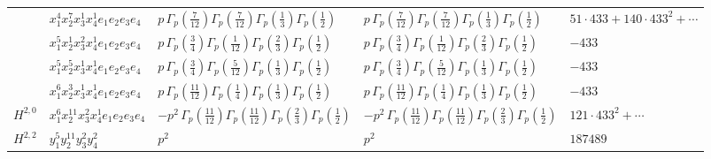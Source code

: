\documentclass[11pt]{article}
\begin{document}
\begin{table}[ht]
{\begin{tabular}{@{}lllll@{}}
 & $x_{1}^{4} x_{2}^{7} x_{3}^{1} x_{4}^{1}  e_{1} e_{2} e_{3} e_{4}$ & $p \, \Gamma_p \left( \frac{7}{12} \right) \Gamma_p \left( \frac{7}{12} \right) \Gamma_p \left( \frac{1}{3} \right) \Gamma_p \left( \frac{1}{2} \right)$ & $p \, \Gamma_p \left( \frac{7}{12} \right) \Gamma_p \left( \frac{7}{12} \right) \Gamma_p \left( \frac{1}{3} \right) \Gamma_p \left( \frac{1}{2} \right)$ & $51{\cdot}433{+}140{\cdot}433^{2}{+}\cdots$ \\
 & $x_{1}^{5} x_{2}^{1} x_{3}^{2} x_{4}^{1}  e_{1} e_{2} e_{3} e_{4}$ & $p \, \Gamma_p \left( \frac{3}{4} \right) \Gamma_p \left( \frac{1}{12} \right) \Gamma_p \left( \frac{2}{3} \right) \Gamma_p \left( \frac{1}{2} \right)$ & $p \, \Gamma_p \left( \frac{3}{4} \right) \Gamma_p \left( \frac{1}{12} \right) \Gamma_p \left( \frac{2}{3} \right) \Gamma_p \left( \frac{1}{2} \right)$ & $-433$ \\
 & $x_{1}^{5} x_{2}^{5} x_{3}^{1} x_{4}^{1}  e_{1} e_{2} e_{3} e_{4}$ & $p \, \Gamma_p \left( \frac{3}{4} \right) \Gamma_p \left( \frac{5}{12} \right) \Gamma_p \left( \frac{1}{3} \right) \Gamma_p \left( \frac{1}{2} \right)$ & $p \, \Gamma_p \left( \frac{3}{4} \right) \Gamma_p \left( \frac{5}{12} \right) \Gamma_p \left( \frac{1}{3} \right) \Gamma_p \left( \frac{1}{2} \right)$ & $-433$ \\
 & $x_{1}^{6} x_{2}^{3} x_{3}^{1} x_{4}^{1}  e_{1} e_{2} e_{3} e_{4}$ & $p \, \Gamma_p \left( \frac{11}{12} \right) \Gamma_p \left( \frac{1}{4} \right) \Gamma_p \left( \frac{1}{3} \right) \Gamma_p \left( \frac{1}{2} \right)$ & $p \, \Gamma_p \left( \frac{11}{12} \right) \Gamma_p \left( \frac{1}{4} \right) \Gamma_p \left( \frac{1}{3} \right) \Gamma_p \left( \frac{1}{2} \right)$ & $-433$ \\
\midrule
$H^{2,0}$ & $x_{1}^{6} x_{2}^{11} x_{3}^{2} x_{4}^{1}  e_{1} e_{2} e_{3} e_{4}$ & $- p^{2} \, \Gamma_p \left( \frac{11}{12} \right) \Gamma_p \left( \frac{11}{12} \right) \Gamma_p \left( \frac{2}{3} \right) \Gamma_p \left( \frac{1}{2} \right)$ & $- p^{2} \, \Gamma_p \left( \frac{11}{12} \right) \Gamma_p \left( \frac{11}{12} \right) \Gamma_p \left( \frac{2}{3} \right) \Gamma_p \left( \frac{1}{2} \right)$ & $121{\cdot}433^{2}{+}\cdots$ \\
\midrule
$H^{2,2}$ & $y_{1}^{5} y_{2}^{11} y_{3}^{2} y_{4}^{2}$ & $p^{2} \,$ & $p^{2} \,$ & $187489$ \\
\bottomrule
\end{tabular}
}
\renewcommand{\arraystretch}{1.0}
\end{table}

\newpage
\end{document}
